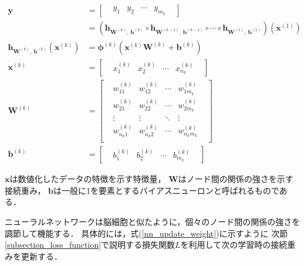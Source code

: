 \documentclass[12pt,a4j,dvipdfmx]{jreport}
\begin{document}
\begin{align}
  \bm{y} &= 
  \begin{bmatrix}
    & y_1 & y_2 & \cdots & y_{m_k}  &
  \end{bmatrix}
  \nonumber
  \\[6pt]
  &= 
  \left(
    \bm{h}_{\bm{W}^{\left(k\right)},~ \bm{b}^{\left(k\right)}}
    \circ
    \bm{h}_{\bm{W}^{\left(k-1\right)},~ \bm{b}^{\left(k-1\right)}}
    \circ
    \cdots
    \circ
    \bm{h}_{\bm{W}^{\left(1\right)},~ \bm{b}^{\left(1\right)}}
    \right)
  \left(
    \bm{x}^{\left(1\right)}
  \right)
  \label{nn}
  \\[6pt]
  \bm{h}_{\bm{W}^{\left(k\right)},~ \bm{b}^{\left(k\right)}}
  \left(
    \bm{x}^{\left(k\right)}
  \right)
  &=
  \bm{\phi}^{\left(k\right)}(\bm{x}^{\left(k\right)}\bm{W}^{\left(k\right)} + \bm{b}^{\left(k\right)})
  \label{nn_layer}
  \\[6pt]
  \bm{x}^{\left(k\right)} &= 
  \begin{bmatrix}
    & x_1^{\left(k\right)} & x_2^{\left(k\right)} & \cdots & x_{n_k}^{\left(k\right)}  &
  \end{bmatrix}
  \label{nn_x}
  \\[6pt]
  \bm{W}^{\left(k\right)} &=
  \begin{bmatrix}
    & w_{11}^{\left(k\right)} & w_{12}^{\left(k\right)} & \cdots & w_{1m_k}^{\left(k\right)} & \\
    & w_{21}^{\left(k\right)} & w_{22}^{\left(k\right)} & \cdots & w_{2m_k}^{\left(k\right)} & \\
    & \vdots & \vdots & \ddots & \vdots & \\
    & w_{n_k1}^{\left(k\right)} & w_{n_k2}^{\left(k\right)} & \cdots & w_{n_km_k}^{\left(k\right)} & \\
  \end{bmatrix}
  \label{nn_w}
  \\[6pt]
  \bm{b}^{\left(k\right)} &=
  \begin{bmatrix}
    & b_1^{\left(k\right)} & b_2^{\left(k\right)} & \cdots & b_{m_k}^{\left(k\right)}  &
  \end{bmatrix}
  \label{nn_b}
\end{align}

$\bm{x}$は数値化したデータの特徴を示す特徴量，
$\bm{W}$はノード間の関係の強さを示す接続重み，
$\bm{b}$は一般に1を要素とするバイアスニューロンと呼ばれるものである．

ニューラルネットワークは脳細胞と似たように，個々のノード間の関係の強さを調節して機能する．
具体的には，式(\ref{nn_update_weight})に示すように
次節\ref{subsection_loss_function}で説明する損失関数$L$を利用して次の学習時の接続重みを更新する．
\end{document}

